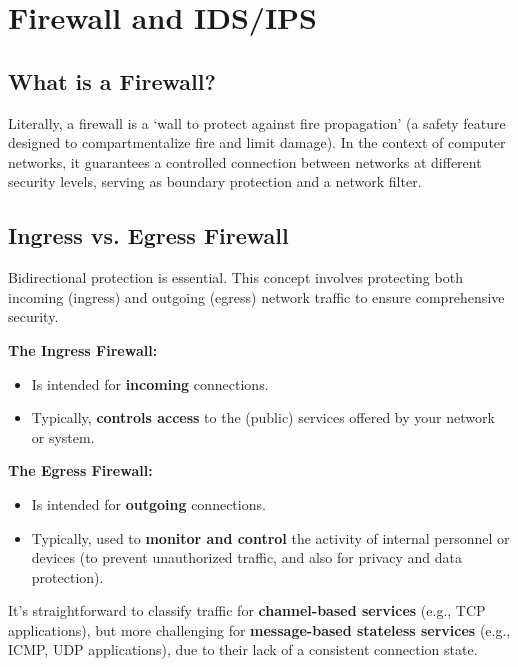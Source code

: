 \chapter{Firewall and IDS/IPS}
\cite{05_Firewalling}

\section*{What is a Firewall?}
Literally, a firewall is a ‘wall to protect against fire propagation’ (a safety feature designed to compartmentalize fire and limit damage). In the context of computer networks, it guarantees a controlled connection between networks at different security levels, serving as boundary protection and a network filter.

\section{Ingress vs. Egress Firewall}
\begin{tcolorbox}[colback=red!10!white, colframe=red!70!black, coltitle=white, title=Beware]
    Bidirectional protection is essential. This concept involves protecting both incoming (ingress) and outgoing (egress) network traffic to ensure comprehensive security.
\end{tcolorbox}

\textbf{The Ingress Firewall:}
\begin{itemize}
    \item Is intended for \textbf{incoming} connections.
    \item Typically, \textbf{controls access} to the (public) services offered by your network or system.
\end{itemize}

\textbf{The Egress Firewall:}
\begin{itemize}
    \item Is intended for \textbf{outgoing} connections.
    \item Typically, used to \textbf{monitor and control} the activity of internal personnel or devices (to prevent unauthorized traffic, and also for privacy and data protection).
\end{itemize}

\begin{tcolorbox}[colback=blue!10!white, colframe=blue!50!white, title=Classification of Traffic]
    It’s straightforward to classify traffic for \textbf{channel-based services} (e.g., TCP applications), but more challenging for \textbf{message-based stateless services} (e.g., ICMP, UDP applications), due to their lack of a consistent connection state.
\end{tcolorbox}


